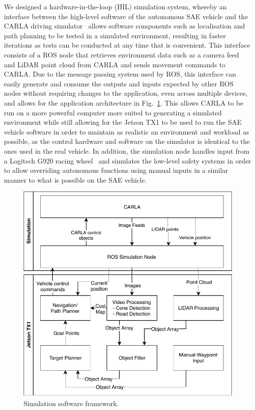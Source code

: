 We designed a hardware-in-the-loop (HIL) simulation system, whereby an interface between the high-level software of the autonomous SAE vehicle and the CARLA driving simulator~\cite{dosovitskiy_carla:_2017} allows software components such as localisation and path planning to be tested in a simulated environment, resulting in faster iterations as tests can be conducted at any time that is convenient. This interface consists of a ROS node that retrieves environment data such as a camera feed and LiDAR point cloud from CARLA and sends movement commands to CARLA. Due to the message passing system used by ROS, this interface can easily generate and consume the outputs and inputs expected by other ROS nodes without requiring changes to the application, even across multiple devices, and allows for the application architecture in Fig.~\ref{fig:7:simarchitecture}. This allows CARLA to be run on a more powerful computer more suited to generating a simulated environment while still allowing for the Jetson TX1 to be used to run the SAE vehicle software in order to maintain as realistic an environment and workload as possible, as the control hardware and software on the simulator is identical to the ones used in the real vehicle. In addition, the simulation node handles input from a Logitech G920 racing wheel~\cite{logitech_logitech_2019} and simulates the low-level safety systems in order to allow overriding autonomous functions using manual inputs in a similar manner to what is possible on the SAE vehicle.

\begin{figure}[H]
	\centering
	\includegraphics[width=0.7\linewidth]{simarchitecture}
	\caption{Simulation software framework.}
	\label{fig:7:simarchitecture}
\end{figure}

